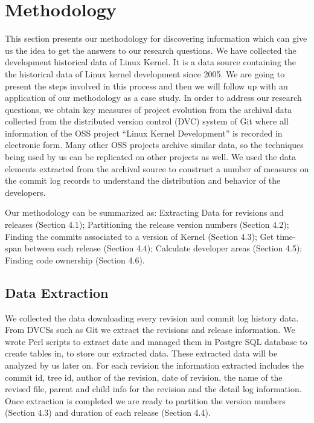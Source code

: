 \documentclass{acm_proc_article-sp}
\begin{document}
\section{Methodology}
This section presents our methodology for discovering information which can give us the idea to get the answers to our research questions. We have collected the development historical data of Linux Kernel. It is a data source containing the the historical data of Linux kernel development since 2005. We are going to present the steps involved in this process and then we will follow up with an application of our methodology as a case study. In order to address our research questions, we obtain key measures of project evolution from the archival data collected from the distributed version control (DVC) system of Git where all information of the OSS project ``Linux Kernel Development'' is recorded in electronic form. Many other OSS projects archive similar data, so the techniques being used by us can be replicated on other projects as well. We used the data elements extracted from the archival source to construct a number of measures on the commit log records to understand the distribution and behavior of the developers.

Our methodology can be summarized as: Extracting Data for revisions and releases (Section 4.1); Partitioning the release version numbers (Section 4.2); Finding the commits associated to a version of Kernel (Section 4.3); Get time-span between each release (Section 4.4); Calculate developer areas (Section 4.5); Finding code ownership (Section 4.6).

\subsection{Data Extraction}
We collected the data downloading every revision and commit log history data. From DVCSs such as Git we extract the revisions and release information. We wrote Perl scripts to extract date and managed them in Postgre SQL database to create tables in, to store our extracted data. These extracted data will be analyzed by us later on. For each revision the information extracted includes the commit id, tree id, author of the revision, date of revision, the name of the revised file, parent and child info for the revision and the detail log information. Once extraction is completed we are ready to partition the version numbers (Section 4.3) and duration  of each release (Section 4.4).
\end{document}
